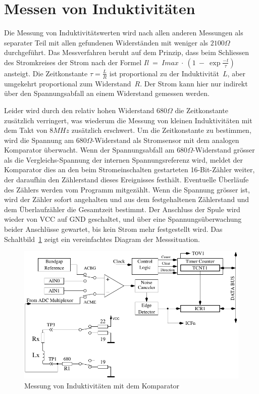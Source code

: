\section{Messen von Induktivitäten}
Die Messung von Induktivitätswerten wird nach allen anderen Messungen als separater Teil mit allen
gefundenen Widerständen mit weniger als \(2100\Omega\) durchgeführt.
Das Messverfahren beruht auf dem Prinzip, dass beim Schliessen des Stromkreises der Strom nach
der Formel \(Il~=~Imax~\cdot~(1~-~\exp{\frac{-t}{\tau}})\) ansteigt.
Die Zeitkonstante \(\tau = \frac{L}{R}\) ist proportional zu der Induktivität~\(L\), aber umgekehrt
proportional zum Widerstand~\(R\). 
Der Strom kann hier nur indirekt über den Spannungsabfall an einem Widerstand
gemessen werden.

Leider wird durch den relativ hohen Widerstand \(680\Omega\) die Zeitkonstante zusätzlich verringert, was
wiederum die Messung von kleinen Induktivitäten mit dem Takt von \(8MHz\) zusätzlich erschwert.
Um die Zeitkonstante zu bestimmen, wird die Spannung am \(680\Omega\)-Widerstand als Stromsensor
mit dem analogen Komparator überwacht. Wenn der Spannungsabfall am \(680\Omega\)-Widerstand grösser als
die Vergleichs-Spannung der internen Spannungsreferenz wird, meldet der Komparator dies an den beim
Stromeinschalten gestarteten 16-Bit-Zähler weiter, der daraufhin den Zählerstand dieses
Ereignisses festhält. Eventuelle Überläufe des Zählers werden vom Programm mitgezählt. 
Wenn die Spannung grösser ist, wird der Zähler sofort angehalten und aus dem festgehaltenen Zählerstand und
dem Überlaufzähler die Gesamtzeit bestimmt.
Der Anschluss der Spule wird wieder von VCC auf GND geschaltet, und über eine Spannungsüberwachung beider
Anschlüsse gewartet, bis kein Strom mehr festgestellt wird.
Das Schaltbild~\ref{fig:Inductance} zeigt ein vereinfachtes Diagram der Messsituation.

\begin{figure}[H]
\centering
\includegraphics[width=.8\textwidth]{../FIG/Inductance.pdf}
\caption{Messung von Induktivitäten mit dem Komparator}
\label{fig:Inductance}
\end{figure}

